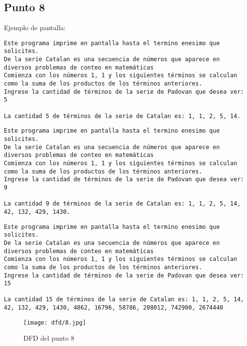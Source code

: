 




\subsection{Punto 8}
	
	Ejemplo de pantalla:
\begin{lstlisting}
Este programa imprime en pantalla hasta el termino enesimo que solicites.
De la serie Catalan es una secuencia de números que aparece en diversos problemas de conteo en matemáticas
Comienza con los números 1, 1 y los siguientes términos se calculan como la suma de los productos de los términos anteriores.
Ingrese la cantidad de términos de la serie de Padovan que desea ver: 5

La cantidad 5 de términos de la serie de Catalan es: 1, 1, 2, 5, 14.
\end{lstlisting}

\begin{lstlisting}
Este programa imprime en pantalla hasta el termino enesimo que solicites.
De la serie Catalan es una secuencia de números que aparece en diversos problemas de conteo en matemáticas
Comienza con los números 1, 1 y los siguientes términos se calculan como la suma de los productos de los términos anteriores.
Ingrese la cantidad de términos de la serie de Padovan que desea ver: 9

La cantidad 9 de términos de la serie de Catalan es: 1, 1, 2, 5, 14, 42, 132, 429, 1430.
\end{lstlisting}

\begin{lstlisting}
Este programa imprime en pantalla hasta el termino enesimo que solicites.
De la serie Catalan es una secuencia de números que aparece en diversos problemas de conteo en matemáticas
Comienza con los números 1, 1 y los siguientes términos se calculan como la suma de los productos de los términos anteriores.
Ingrese la cantidad de términos de la serie de Padovan que desea ver: 15

La cantidad 15 de términos de la serie de Catalan es: 1, 1, 2, 5, 14, 42, 132, 429, 1430, 4862, 16796, 58786, 208012, 742900, 2674440
\end{lstlisting}


\begin{figure}
  \centering
  \texttt{[image: dfd/8.jpg]}
  \caption{ DFD del punto 8}
  \label{fig: DFD del punto 8}
\end{figure}



